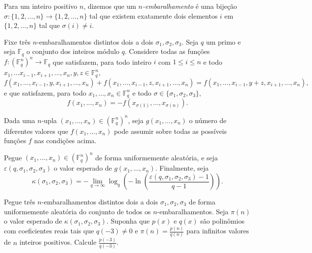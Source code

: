 Para um inteiro positivo $n$, dizemos que um \emph{$n$-embaralhamento} é uma bijeção $\sigma: \{1,2, \dots , n\} \rightarrow \{1,2, \dots , n\}$ tal que existem exatamente dois elementos $i$ em $\{1,2, \dots , n\}$ tal que $\sigma(i) \neq i$.

Fixe três $n$-embaralhamentos distintos dois a dois $\sigma_1,\sigma_2,\sigma_3$. Seja $q$ um primo e seja $\mathbb{F}_q$ o conjunto dos inteiros módulo $q$. Considere todas as funções $f:(\mathbb{F}_q^n)^n\to\mathbb{F}_q$ que satisfazem, para todo inteiro $i$ com $1 \leq i \leq n$ e todo $x_1,\ldots x_{i-1},x_{i+1}, \dots ,x_n, y, z\in\mathbb{F}_q^n$, \[f(x_1, \ldots ,x_{i-1}, y, x_{i+1}, \ldots , x_n) +f(x_1, \ldots ,x_{i-1}, z, x_{i+1}, \ldots , x_n) = f(x_1, \ldots ,x_{i-1}, y+z, x_{i+1}, \ldots , x_n), \] e que satisfazem, para todo $x_1,\ldots,x_n\in\mathbb{F}_q^n$ e todo $\sigma\in\{\sigma_1,\sigma_2,\sigma_3\}$, \[f(x_1,\ldots,x_n)=-f(x_{\sigma(1)},\ldots,x_{\sigma(n)}).\]

Dada uma $n$-upla $(x_1,\ldots,x_n)\in(\mathbb{F}_q^n)^n$, seja $g(x_1,\ldots,x_n)$ o número de diferentes valores que $f(x_1,\ldots,x_n)$ pode assumir sobre todas as possíveis funções $f$ nas condições acima.
	
Pegue $(x_1,\ldots,x_n)\in(\mathbb{F}_q^n)^n$ de forma uniformemente aleatória, e seja $\varepsilon(q,\sigma_1,\sigma_2,\sigma_3)$ o valor esperado de $g(x_1,\ldots,x_n)$. Finalmente, seja \[\kappa(\sigma_1,\sigma_2,\sigma_3)=-\lim_{q \to \infty}\log_q\left(-\ln\left(\frac{\varepsilon(q,\sigma_1,\sigma_2,\sigma_3)-1}{q-1}\right)\right).\]

Pegue três $n$-embaralhamentos distintos dois a dois $\sigma_1,\sigma_2,\sigma_3$ de forma uniformemente aleatória do conjunto de todos os $n$-embaralhamentos. Seja $\pi(n)$ o valor esperado de $\kappa(\sigma_1,\sigma_2,\sigma_3)$. Suponha que $p(x)$ e $q(x)$ são polinômios com coeficientes reais tais que $q(-3) \neq 0$ e $\pi(n)=\frac{p(n)}{q(n)}$ para infinitos valores de $n$ inteiros positivos. Calcule $\frac{p\left(-3\right)}{q\left(-3\right)}$.
